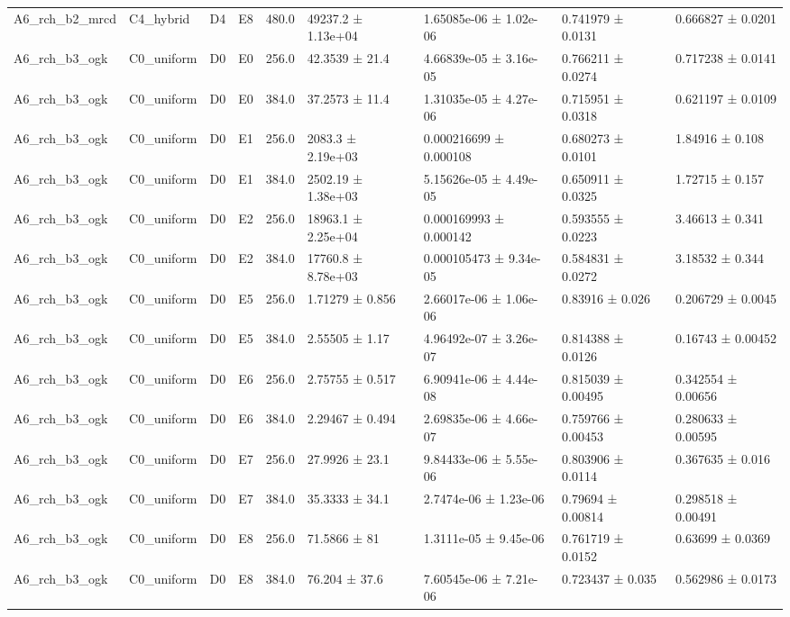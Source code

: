 \begin{table}
\begin{tabular}{lllllllll}
A6\_rch\_b2\_mrcd & C4\_hybrid & D4 & E8 & 480.0 & 49237.2 ± 1.13e+04 & 1.65085e-06 ± 1.02e-06 & 0.741979 ± 0.0131 & 0.666827 ± 0.0201 \\
A6\_rch\_b3\_ogk & C0\_uniform & D0 & E0 & 256.0 & 42.3539 ± 21.4 & 4.66839e-05 ± 3.16e-05 & 0.766211 ± 0.0274 & 0.717238 ± 0.0141 \\
A6\_rch\_b3\_ogk & C0\_uniform & D0 & E0 & 384.0 & 37.2573 ± 11.4 & 1.31035e-05 ± 4.27e-06 & 0.715951 ± 0.0318 & 0.621197 ± 0.0109 \\
A6\_rch\_b3\_ogk & C0\_uniform & D0 & E1 & 256.0 & 2083.3 ± 2.19e+03 & 0.000216699 ± 0.000108 & 0.680273 ± 0.0101 & 1.84916 ± 0.108 \\
A6\_rch\_b3\_ogk & C0\_uniform & D0 & E1 & 384.0 & 2502.19 ± 1.38e+03 & 5.15626e-05 ± 4.49e-05 & 0.650911 ± 0.0325 & 1.72715 ± 0.157 \\
A6\_rch\_b3\_ogk & C0\_uniform & D0 & E2 & 256.0 & 18963.1 ± 2.25e+04 & 0.000169993 ± 0.000142 & 0.593555 ± 0.0223 & 3.46613 ± 0.341 \\
A6\_rch\_b3\_ogk & C0\_uniform & D0 & E2 & 384.0 & 17760.8 ± 8.78e+03 & 0.000105473 ± 9.34e-05 & 0.584831 ± 0.0272 & 3.18532 ± 0.344 \\
A6\_rch\_b3\_ogk & C0\_uniform & D0 & E5 & 256.0 & 1.71279 ± 0.856 & 2.66017e-06 ± 1.06e-06 & 0.83916 ± 0.026 & 0.206729 ± 0.0045 \\
A6\_rch\_b3\_ogk & C0\_uniform & D0 & E5 & 384.0 & 2.55505 ± 1.17 & 4.96492e-07 ± 3.26e-07 & 0.814388 ± 0.0126 & 0.16743 ± 0.00452 \\
A6\_rch\_b3\_ogk & C0\_uniform & D0 & E6 & 256.0 & 2.75755 ± 0.517 & 6.90941e-06 ± 4.44e-08 & 0.815039 ± 0.00495 & 0.342554 ± 0.00656 \\
A6\_rch\_b3\_ogk & C0\_uniform & D0 & E6 & 384.0 & 2.29467 ± 0.494 & 2.69835e-06 ± 4.66e-07 & 0.759766 ± 0.00453 & 0.280633 ± 0.00595 \\
A6\_rch\_b3\_ogk & C0\_uniform & D0 & E7 & 256.0 & 27.9926 ± 23.1 & 9.84433e-06 ± 5.55e-06 & 0.803906 ± 0.0114 & 0.367635 ± 0.016 \\
A6\_rch\_b3\_ogk & C0\_uniform & D0 & E7 & 384.0 & 35.3333 ± 34.1 & 2.7474e-06 ± 1.23e-06 & 0.79694 ± 0.00814 & 0.298518 ± 0.00491 \\
A6\_rch\_b3\_ogk & C0\_uniform & D0 & E8 & 256.0 & 71.5866 ± 81 & 1.3111e-05 ± 9.45e-06 & 0.761719 ± 0.0152 & 0.63699 ± 0.0369 \\
A6\_rch\_b3\_ogk & C0\_uniform & D0 & E8 & 384.0 & 76.204 ± 37.6 & 7.60545e-06 ± 7.21e-06 & 0.723437 ± 0.035 & 0.562986 ± 0.0173 \\

\end{tabular}
\end{table}
